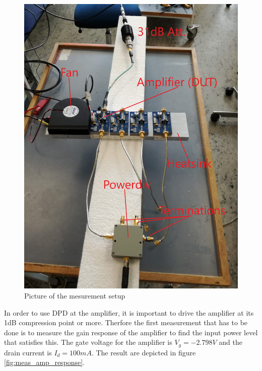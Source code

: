 \begin{figure}[H]
\centering 
\includegraphics[scale = 0.06]{figures/measurement/cree/meas1/meas_set_1.jpg}
\caption{Picture of the mesurement setup }
\label{fig:meas_amp_pic}
\end{figure}
 

In order to use DPD at the amplifier, it is important to drive the amplifier at its 1dB compression point or more. Therfore the first measurement that has to be done is to measure the gain response of the amplifier to find the input power level that satisfies this. The gate voltage for the amplifier is $V_g = -2.798V$ and the drain current is $I_d = 100mA$. The result are depicted in figure \ref{fig:meas_amp_response}.   

